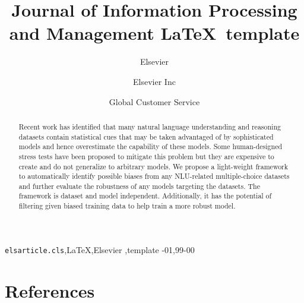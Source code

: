 \documentclass[review]{elsarticle}
\begin{document}
\begin{frontmatter}

\title{Journal of Information Processing and Management \LaTeX\ template}

\author{Elsevier}
\address{Radarweg 29, Amsterdam}

\author[mymainaddress,mysecondaryaddress]{Elsevier Inc}

\author[mysecondaryaddress]{Global Customer Service}

\address[mymainaddress]{1600 John F Kennedy Boulevard, Philadelphia}
\address[mysecondaryaddress]{360 Park Avenue South, New York}

\begin{abstract}
Recent work has identified
that many natural language understanding and reasoning datasets contain statistical cues that
may be taken advantaged of by sophisticated models and hence overestimate the 
capability of these models.
Some human-designed stress tests have been proposed to mitigate this problem
but they are expensive to create and do not generalize to arbitrary
models. We propose a light-weight framework to automatically identify possible biases
from any NLU-related multiple-choice datasets and further evaluate 
the robustness of any models targeting the datasets. 
The framework is dataset and model independent. Additionally, it has
the potential of filtering given biased training data to help train a more
robust model. 
\end{abstract}

\begin{keyword}
\texttt{elsarticle.cls}\sep \LaTeX\sep Elsevier \sep template
-01\sep  99-00
\end{keyword}

\end{frontmatter}

\linenumbers









\section*{References}


\end{document}

